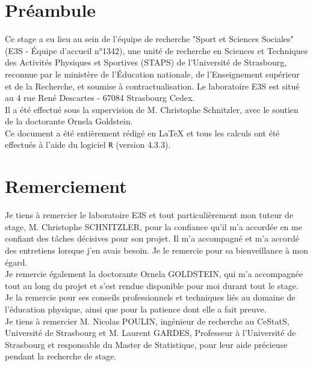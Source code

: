 \documentclass[12pt,a4paper]{article}
\renewcommand{\sectionmark}[1]{\markboth{#1}{}}
\begin{document}
	
	
	\newpage
	\renewcommand{\contentsname}{Table des matières} 
	\tableofcontents
	\newpage
	\section*{Préambule}
	\sectionmark{Préambule}
	Ce stage a eu lieu au sein de l'équipe de recherche "Sport et Sciences Sociales" (E3S - Équipe d'accueil n°1342), une unité de recherche en Sciences et Techniques des Activités Physiques et Sportives (STAPS) de l'Université de Strasbourg, reconnue par le ministère de l'Éducation nationale, de l'Enseignement supérieur et de la Recherche, et soumise à contractualisation. Le laboratoire E3S est situé au 4 rue René Descartes - 67084 Strasbourg Cedex.\\
	
	Il a été effectué sous la supervision de M. Christophe Schnitzler, avec le soutien de la doctorante Ornela Goldstein.\\
	
	Ce document a été entièrement rédigé en \LaTeX{} et tous les calculs ont été effectués à l'aide du logiciel \texttt{R} (version 4.3.3).
	
	
	

	\newpage
	\section*{Remerciement}
	\sectionmark{Remerciement}
	Je tiens à remercier le laboratoire E3S et tout particulièrement mon tuteur de stage, M. Christophe SCHNITZLER, pour la confiance qu'il m'a accordée en me confiant des tâches décisives pour son projet. Il m'a accompagné et m'a accordé des entretiens lorsque j'en avais besoin. Je le remercie pour sa bienveillance à mon égard.\\
	
	Je remercie également la doctorante Ornela GOLDSTEIN, qui m'a accompagnée tout au long du projet et s'est rendue disponible pour moi durant tout le stage. Je la remercie pour ses conseils professionnels et techniques liés au domaine de l'éducation physique, ainsi que pour la patience dont elle a fait preuve.\\
	
	Je tiens à remercier M. Nicolas POULIN, ingénieur de recherche au CeStatS, Université de Strasbourg et M. Laurent GARDES, Professeur à l'Université de Strasbourg et responsable du Master de Statistique, pour leur aide précieuse pendant la recherche de stage.\\
	
\end{document}
